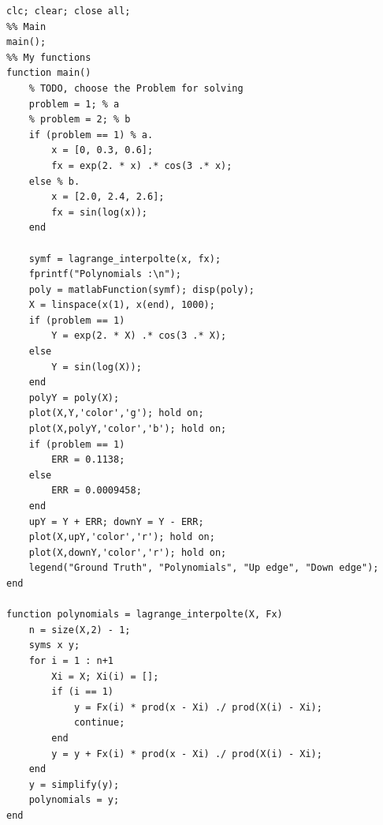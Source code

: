 \documentclass{article}
\begin{document}
\begin{lstlisting}
clc; clear; close all;
%% Main
main();
%% My functions
function main()
    % TODO, choose the Problem for solving
    problem = 1; % a
    % problem = 2; % b
    if (problem == 1) % a.
        x = [0, 0.3, 0.6];
        fx = exp(2. * x) .* cos(3 .* x);
    else % b.
        x = [2.0, 2.4, 2.6];
        fx = sin(log(x));
    end
    
    symf = lagrange_interpolte(x, fx);
    fprintf("Polynomials :\n");
    poly = matlabFunction(symf); disp(poly);
    X = linspace(x(1), x(end), 1000);
    if (problem == 1)
        Y = exp(2. * X) .* cos(3 .* X);
    else
        Y = sin(log(X));
    end
    polyY = poly(X);
    plot(X,Y,'color','g'); hold on;
    plot(X,polyY,'color','b'); hold on;
    if (problem == 1)
        ERR = 0.1138;
    else
        ERR = 0.0009458; 
    end
    upY = Y + ERR; downY = Y - ERR;
    plot(X,upY,'color','r'); hold on;
    plot(X,downY,'color','r'); hold on;
    legend("Ground Truth", "Polynomials", "Up edge", "Down edge");
end

function polynomials = lagrange_interpolte(X, Fx)
    n = size(X,2) - 1;
    syms x y;
    for i = 1 : n+1
        Xi = X; Xi(i) = [];
        if (i == 1)
            y = Fx(i) * prod(x - Xi) ./ prod(X(i) - Xi);
            continue;
        end
        y = y + Fx(i) * prod(x - Xi) ./ prod(X(i) - Xi);
    end
    y = simplify(y);
    polynomials = y;
end
\end{lstlisting}
\end{document}
